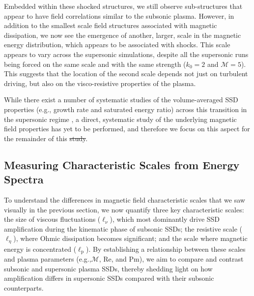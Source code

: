 \documentclass[12pt,twoside]{extreport}
\makeatletter
\newcommand{\mReh}{\ensuremath{\mathrm{Re}}} %
\newcommand{\mPrm}{\ensuremath{\mathrm{Pm}}} %
\newcommand{\mSonicMach}{\ensuremath{\mathcal{M}}} %
\newcommand{\eg}{e.g.,\xspace} %
\providecommand{\DIFaddtex}[1]{{\protect\color{DIFgreen}\uwave{#1}}} %
\providecommand{\DIFdeltex}[1]{{\protect\color{DIFpurple}\sout{#1}}} %
\providecommand{\DIFaddbegin}{} %
\providecommand{\DIFaddend}{} %
\providecommand{\DIFdelbegin}{} %
\providecommand{\DIFdelend}{} %
\providecommand{\DIFadd}[1]{\texorpdfstring{\DIFaddtex{#1}}{#1}} %
\providecommand{\DIFdel}[1]{\texorpdfstring{\DIFdeltex{#1}}{}} %
\providecommand{\DIFscaledelfig}{0.5}
\newlength{\DIFdelgraphicswidth} %
\newlength{\DIFdelgraphicsheight} %
\providecommand{\DIFaddincludegraphics}[2][]{{\color{DIFgreen}\fbox{\DIFOincludegraphics[#1]{#2}}}} %
\providecommand{\DIFdelincludegraphics}[2][]{%
\sbox{\DIFdelgraphicsbox}{\DIFOincludegraphics[#1]{#2}}%
\settoboxwidth{\DIFdelgraphicswidth}{\DIFdelgraphicsbox} %
\settoboxtotalheight{\DIFdelgraphicsheight}{\DIFdelgraphicsbox} %
\scalebox{\DIFscaledelfig}{%
\parbox[b]{\DIFdelgraphicswidth}{\usebox{\DIFdelgraphicsbox}\\[-\baselineskip] \rule{\DIFdelgraphicswidth}{0em}}\llap{\resizebox{\DIFdelgraphicswidth}{\DIFdelgraphicsheight}{%
\setlength{\unitlength}{\DIFdelgraphicswidth}%
\begin{picture}(1,1)%
\thicklines\linethickness{2pt} %
{\color{DIFpurple}\put(0,0){\framebox(1,1){}}}%
{\color{DIFpurple}\put(0,0){\line( 1,1){1}}}%
{\color{DIFpurple}\put(0,1){\line(1,-1){1}}}%
\end{picture}%
}\hspace*{3pt}}} %
} %
\DeclareRobustCommand{\DIFaddbegin}{\DIFOaddbegin \let\includegraphics\DIFaddincludegraphics} %
\DeclareRobustCommand{\DIFaddend}{\DIFOaddend \let\includegraphics\DIFOincludegraphics} %
\DeclareRobustCommand{\DIFdelbegin}{\DIFOdelbegin \let\includegraphics\DIFdelincludegraphics} %
\DeclareRobustCommand{\DIFdelend}{\DIFOaddend \let\includegraphics\DIFOincludegraphics} %
\let\sout@orig\sout %
\renewcommand{\sout}[1]{\ifmmode\text{\sout@orig{\ensuremath{#1}}}\else\sout@orig{#1}\fi} %
\makeatother
\begin{document}
Embedded within these shocked structures, we still observe sub-structures that appear to have field correlations similar to the subsonic plasma. However, in addition to the smallest scale field structures associated with magnetic dissipation, we now see the emergence of another, larger, scale in the magnetic energy distribution, which appears to be associated with shocks. This scale appears to vary across the supersonic simulations, despite all the supersonic runs being forced on the same scale and with the same strength (\DIFdelbegin \DIFdel{$k_0 = 2$ }\DIFdelend \DIFaddbegin \DIFadd{$k_\mathrm{turb} = 2$ }\DIFaddend and $\mSonicMach = 5$). This suggests that the location of the second scale depends not just on turbulent driving, but also on the visco-resistive properties of the plasma.

While there exist a number of systematic studies of the volume-averaged SSD properties (\eg growth rate and saturated energy ratio) across this transition in the supersonic regime \citep[see for example][]{federrath2011mach, chirakkara2021efficient}, a direct, systematic study of the underlying magnetic field properties has yet to be performed, and therefore we focus on this aspect for the remainder of this \DIFdelbegin \DIFdel{study}\DIFdelend \DIFaddbegin \DIFadd{chapter}\DIFaddend .

\subsection{Measuring Characteristic Scales from Energy Spectra}
\label{sec:results:tools}

To understand the differences in magnetic field characteristic scales that we saw visually in the previous section, we now quantify three key characteristic scales: the size of viscous fluctuations ($\ell_\nu$), which most dominantly drive SSD amplification during the kinematic phase of subsonic SSDs; the resistive scale ($\ell_\eta$), where Ohmic dissipation becomes significant; and the scale where magnetic energy is concentrated ($\ell_\mathrm{p}$). By establishing a relationship between these scales and plasma parameters (\eg $\mSonicMach$, $\mReh$, and $\mPrm$), we aim to compare and contrast subsonic and supersonic plasma SSDs, thereby shedding light on how amplification differs in supersonic SSDs compared with their subsonic counterparts.
\end{document}
